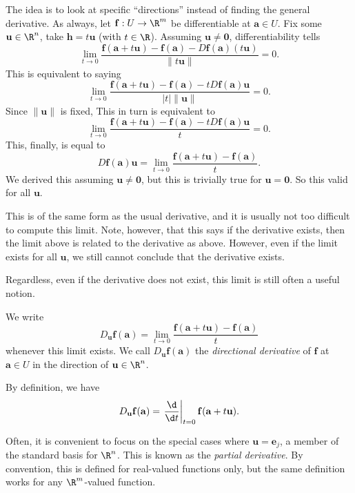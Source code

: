 \documentclass[a4paper]{article}
\begin{document}
The idea is to look at specific ``directions'' instead of finding the general derivative. As always, let $\mathbf{f}: U \to \R^m$ be differentiable at $\mathbf{a} \in U$. Fix some $\mathbf{u} \in \R^n$, take $\mathbf{h} = t \mathbf{u}$ (with $t \in \R$). Assuming $\mathbf{u} \not= \mathbf{0}$, differentiability tells
\[
  \lim_{t \to 0} \frac{\mathbf{f}(\mathbf{a} + t\mathbf{u}) - \mathbf{f}(\mathbf{a}) - D \mathbf{f}(\mathbf{a}) (t\mathbf{u})}{\|t \mathbf{u}\|} = 0.
\]
This is equivalent to saying
\[
  \lim_{t \to 0} \frac{\mathbf{f}(\mathbf{a} + t\mathbf{u}) - \mathbf{f}(\mathbf{a}) - t D \mathbf{f}(\mathbf{a}) \mathbf{u}}{|t|\|\mathbf{u}\|} = 0.
\]
Since $\|\mathbf{u}\|$ is fixed, This in turn is equivalent to
\[
  \lim_{t \to 0} \frac{\mathbf{f}(\mathbf{a} + t\mathbf{u}) - \mathbf{f}(\mathbf{a}) - t D \mathbf{f}(\mathbf{a}) \mathbf{u}}{t} = 0.
\]
This, finally, is equal to
\[
  D\mathbf{f}(\mathbf{a}) \mathbf{u} = \lim_{t \to 0} \frac{\mathbf{f}(\mathbf{a} + t\mathbf{u}) - \mathbf{f}(\mathbf{a})}{t}.
\]
We derived this assuming $\mathbf{u} \not= \mathbf{0}$, but this is trivially true for $\mathbf{u} = \mathbf{0}$. So this valid for all $\mathbf{u}$.

This is of the same form as the usual derivative, and it is usually not too difficult to compute this limit. Note, however, that this says if the derivative exists, then the limit above is related to the derivative as above. However, even if the limit exists for all $\mathbf{u}$, we still cannot conclude that the derivative exists.

Regardless, even if the derivative does not exist, this limit is still often a useful notion.

\begin{defi}
  We write
  \[
    D_{\mathbf{u}} \mathbf{f}(\mathbf{a}) = \lim_{t\to 0} \frac{\mathbf{f}(\mathbf{a} + t\mathbf{u}) - \mathbf{f}(\mathbf{a})}{t}
  \]
  whenever this limit exists. We call $D_{\mathbf{u}} \mathbf{f} (\mathbf{a})$ the \emph{directional derivative} of $\mathbf{f}$ at $\mathbf{a} \in U$ in the direction of $\mathbf{u} \in \R^n$.

  By definition, we have
  \[
    D_{\mathbf{u}} \mathbf{f}(\mathbf{a}) = \left.\frac{\d}{\d t}\right|_{t = 0} \mathbf{f}(\mathbf{a} + t\mathbf{u}).
  \]
\end{defi}

Often, it is convenient to focus on the special cases where $\mathbf{u} = \mathbf{e}_j$, a member of the standard basis for $\R^n$. This is known as the \emph{partial derivative}. By convention, this is defined for real-valued functions only, but the same definition works for any $\R^m$-valued function.
\end{document}
